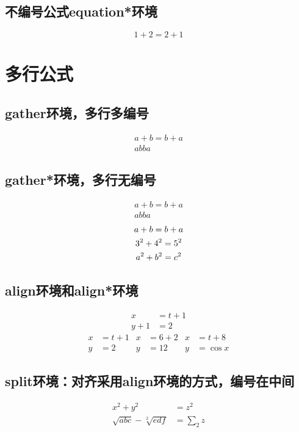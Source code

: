 \documentclass{ctexart}
\begin{document}
    \subsection{不编号公式equation*环境}
        \begin{equation*}
            1+2=2+1
        \end{equation*}
    \section{多行公式}
    \subsection{gather环境，多行多编号}
        \begin{gather}
            a + b = b + a \\
            ab ba
        \end{gather}
    \subsection{gather*环境，多行无编号}
        \begin{gather*}
            a + b = b + a \\
            ab ba
        \end{gather*}
        \begin{gather}
            a + b = b + a \notag \\
            3^2 + 4^2 = 5^2 \notag \\
            a^2 + b^2 = c^2
        \end{gather}
    \subsection{align环境和align*环境}
        \begin{align}
            x &= t+1 \\
            y+1 &= 2
        \end{align}
        \begin{align*}
            x &= t+1& x&=6+2 &x&=t+8 \\
            y &= 2 &y&=12 &y &=\cos x
        \end{align*}
    \subsection{split环境：对齐采用align环境的方式，编号在中间}
        \begin{equation}
        \begin{split}
            \label{eq:eq}
            x^2+y^2 &=z^2 \\
            \sqrt{abc}-\sqrt[2]{edf} &=\sum_2 z
        \end{split}
        \end{equation}
\end{document}
